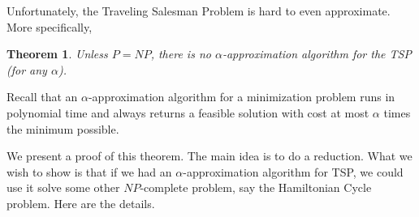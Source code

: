 \documentclass[12pt]{article}
\newtheorem{theorem}{Theorem}
\begin{document}
Unfortunately, the Traveling Salesman Problem is hard to even approximate. More specifically,

\begin{theorem}
    Unless \(P=NP\), there is no \(\alpha\)-approximation algorithm for the TSP (for any \(\alpha\)).
\end{theorem}

Recall that an \(\alpha\)-approximation algorithm for a minimization problem runs in polynomial time and always returns a feasible solution with cost at most \(\alpha\) times the minimum possible.

We present a proof of this theorem. The main idea is to do a reduction. What we wish to show is that if we had an \(\alpha\)-approximation algorithm for TSP, we could use it solve some other \(NP\)-complete problem, say the Hamiltonian Cycle problem. Here are the details.
\end{document}
